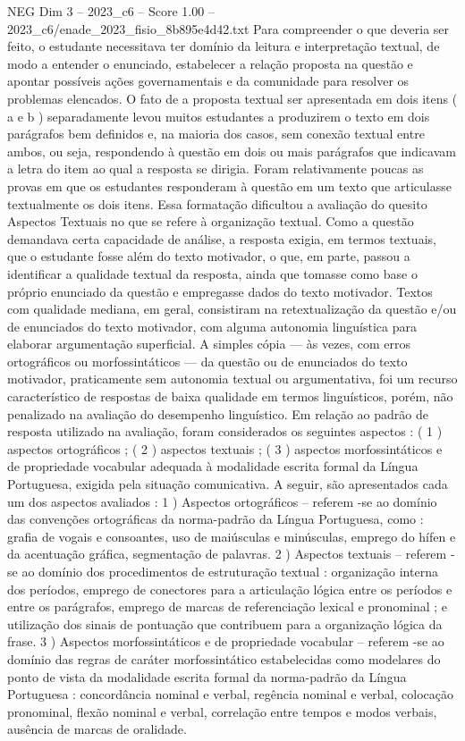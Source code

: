 \begin{textsample}{NEG Dim 3 – 2023\_c6 – Score 1.00 – 2023\_c6/enade\_2023\_fisio\_8b895e4d42.txt}
Para compreender o que deveria ser feito, o estudante necessitava ter domínio da leitura e interpretação textual, de modo a entender o enunciado, estabelecer a relação proposta na questão e apontar possíveis ações governamentais e da comunidade para resolver os problemas elencados.
O fato de a proposta textual ser apresentada em dois itens ( a e b ) separadamente levou muitos estudantes a produzirem o texto em dois parágrafos bem definidos e, na maioria dos casos, sem conexão textual entre ambos, ou seja, respondendo à questão em dois ou mais parágrafos que indicavam a letra do item ao qual a resposta se dirigia.
Foram relativamente poucas as provas em que os estudantes responderam à questão em um texto que articulasse textualmente os dois itens.
Essa formatação dificultou a avaliação do quesito Aspectos Textuais no que se refere à organização textual.
Como a questão demandava certa capacidade de análise, a resposta exigia, em termos textuais, que o estudante fosse além do texto motivador, o que, em parte, passou a identificar a qualidade textual da resposta, ainda que tomasse como base o próprio enunciado da questão e empregasse dados do texto motivador.
Textos com qualidade mediana, em geral, consistiram na retextualização da questão e/ou de enunciados do texto motivador, com alguma autonomia linguística para elaborar argumentação superficial.
A simples cópia — às vezes, com erros ortográficos ou morfossintáticos — da questão ou de enunciados do texto motivador, praticamente sem autonomia textual ou argumentativa, foi um recurso característico de respostas de baixa qualidade em termos linguísticos, porém, não penalizado na avaliação do desempenho linguístico.
Em relação ao padrão de resposta utilizado na avaliação, foram considerados os seguintes aspectos : ( 1 ) aspectos ortográficos ; ( 2 ) aspectos textuais ; ( 3 ) aspectos morfossintáticos e de propriedade vocabular adequada à modalidade escrita formal da Língua Portuguesa, exigida pela situação comunicativa.
A seguir, são apresentados cada um dos aspectos avaliados : 1 ) Aspectos ortográficos – referem -se ao domínio das convenções ortográficas da norma-padrão da Língua Portuguesa, como : grafia de vogais e consoantes, uso de maiúsculas e minúsculas, emprego do hífen e da acentuação gráfica, segmentação de palavras. 2 ) Aspectos textuais – referem -se ao domínio dos procedimentos de estruturação textual : organização interna dos períodos, emprego de conectores para a articulação lógica entre os períodos e entre os parágrafos, emprego de marcas de referenciação lexical e pronominal ; e utilização dos sinais de pontuação que contribuem para a organização lógica da frase. 3 ) Aspectos morfossintáticos e de propriedade vocabular – referem -se ao domínio das regras de caráter morfossintático estabelecidas como modelares do ponto de vista da modalidade escrita formal da norma-padrão da Língua Portuguesa : concordância nominal e verbal, regência nominal e verbal, colocação pronominal, flexão nominal e verbal, correlação entre tempos e modos verbais, ausência de marcas de oralidade.

\end{textsample}
